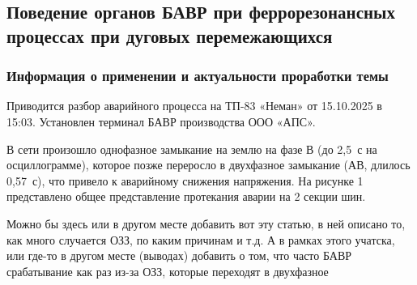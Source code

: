 
\subsection{Поведение органов БАВР при феррорезонансных процессах при дуговых перемежающихся }
\label{sec:ch1_ferroresonance_ozz}

\subsubsection{Информация о применении и актуальности проработки темы}

Приводится разбор аварийного процесса на ТП-83 «Неман» от 15.10.2025 в 15:03. Установлен терминал БАВР производства ООО «АПС».

В сети произошло однофазное замыкание на землю на фазе В (до 2,5~с на осциллограмме), которое позже переросло в двухфазное замыкание (АВ, длилось 0,57~с), что привело к аварийному снижения напряжения. На рисунке 1 представлено общее представление протекания аварии на 2 секции шин.

Можно бы здесь или в другом месте добавить вот эту статью, в ней описано то, как много случается ОЗЗ, по каким причинам и т.д. А в рамках этого учатска, или где-то в другом месте (выводах) добавить о том, что часто БАВР срабатывание как раз из-за ОЗЗ, которые переходят в двухфазное

